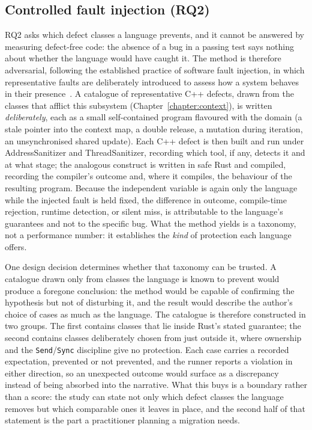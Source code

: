 \documentclass[english,twoside,openright,a4paper,censored,csm,software-track-2020]{HYthesisML}
\begin{document}
\subsection{Controlled fault injection (RQ2)}
RQ2 asks which defect classes a language prevents, and it cannot be answered by measuring
defect-free code: the absence of a bug in a passing test says nothing about whether the
language would have caught it. The method is therefore adversarial, following the established
practice of software fault injection, in which representative faults are deliberately introduced
to assess how a system behaves in their presence~\cite{natella2016fault}. A catalogue of
representative C++ defects, drawn from the classes that afflict this subsystem
(Chapter~\ref{chapter:context}), is written \emph{deliberately}, each as a small self-contained
program flavoured with the domain (a stale pointer into the context map, a double release, a
mutation during iteration, an unsynchronised shared update). Each C++ defect is then built and
run under AddressSanitizer and ThreadSanitizer, recording which tool, if any, detects it and at
what stage; the analogous construct is written in safe Rust and compiled, recording the
compiler's outcome and, where it compiles, the behaviour of the resulting program. Because the
independent variable is again only the language while the injected fault is held fixed, the
difference in outcome, compile-time rejection, runtime detection, or silent miss, is
attributable to the language's guarantees and not to the specific bug. What the method yields is
a taxonomy, not a performance number: it establishes the \emph{kind} of protection
each language offers.

One design decision determines whether that taxonomy can be trusted. A catalogue drawn only
from classes the language is known to prevent would produce a foregone conclusion: the method
would be capable of confirming the hypothesis but not of disturbing it, and the result would
describe the author's choice of cases as much as the language. The catalogue is therefore
constructed in two groups. The first contains classes that lie inside Rust's stated guarantee;
the second contains classes deliberately chosen from just outside it, where ownership and the
\texttt{Send}/\texttt{Sync} discipline give no protection. Each case carries a recorded
expectation, prevented or not prevented, and the runner reports a violation in either
direction, so an unexpected outcome would surface as a discrepancy instead of being absorbed
into the narrative. What this buys is a boundary rather than a score: the study can state not
only which defect classes the language removes but which comparable ones it leaves in place,
and the second half of that statement is the part a practitioner planning a migration
needs.
\end{document}
